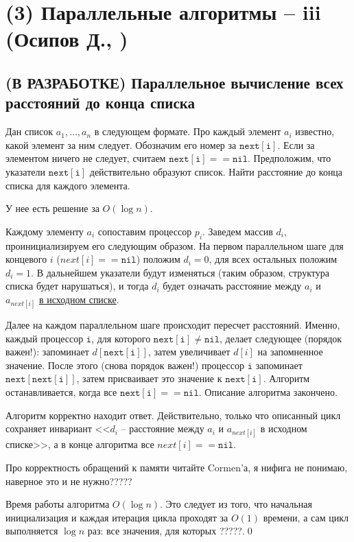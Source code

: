 \section{(3) Параллельные алгоритмы -- iii (Осипов Д., \groth)}
\newcommand{\nxt}[1] {\mathtt{next[#1]}}
\newcommand{\nil} {\mathtt{nil}}
\subsection{(В РАЗРАБОТКЕ) Параллельное вычисление всех расстояний до конца списка}
\begin{problem}
Дан список $a_1, \ldots, a_n$  в следующем формате. Про каждый элемент $a_i$ известно, какой элемент за ним следует. Обозначим его номер за $\nxt{i}$. Если за элементом ничего не следует, считаем $\nxt{i} == \nil$. Предположим, что указатели $\nxt{i}$ действительно образуют список. Найти расстояние до конца списка для каждого элемента.
\end{problem}
У нее есть решение за $O(\log n)$.

Каждому элементу $a_i$ сопоставим процессор $p_i$. Заведем массив $d_i$, проинициализируем его следующим образом. На первом параллельном шаге для концевого $i$ ($next[i]==\nil$) положим $d_i = 0$, для всех остальных положим $d_i = 1$. В дальнейшем указатели будут изменяться (таким образом, структура списка будет нарушаться), и тогда $d_i$ будет означать расстояние между $a_i$ и $a_{next[i]}$ \underline{в исходном списке}.

Далее на каждом параллельном шаге происходит пересчет расстояний. Именно, каждый процессор $\mathtt i$, для которого $\nxt{i} \neq \nil$, делает следующее (порядок важен!): запоминает $d[\nxt{i}]$, затем увеличивает $d[i]$ на запомненное значение. После этого (снова порядок важен!) процессор $\mathtt i$ запоминает $\nxt{\nxt{i}}$, затем присваивает это значение к $\nxt{i}$. Алгоритм останавливается, когда все $\nxt{i} == \nil$. Описание алгоритма закончено.

Алгоритм корректно находит ответ. Действительно, только что описанный цикл сохраняет инвариант <<$d_i$ -- расстояние между $a_i$ и $a_{next[i]}$ в исходном списке>>, а в конце алгоритма все $next[i] == \nil$. 

Про корректность обращений к памяти читайте Cormen'а, я нифига не понимаю, наверное это и не нужно?????

Время работы алгоритма $O(\log n)$. Это следует из того, что начальная инициализация и каждая итерация цикла проходят за $O(1)$ времени, а сам цикл выполняется $\log n$ раз: все значения, для которых ?????.\qed

